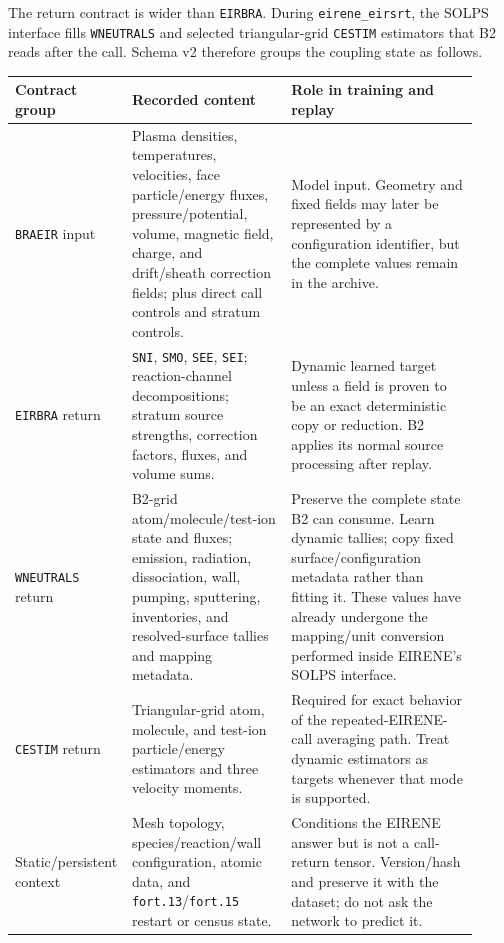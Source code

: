 \documentclass[11pt]{article}
\begin{document}
The return contract is wider than \texttt{EIRBRA}. During
\texttt{eirene\_eirsrt}, the SOLPS interface fills \texttt{WNEUTRALS} and
selected triangular-grid \texttt{CESTIM} estimators that B2 reads after the
call. Schema v2 therefore groups the coupling state as follows.

\begin{longtable}{@{}p{0.18\linewidth}p{0.34\linewidth}p{0.40\linewidth}@{}}
\toprule
Contract group & Recorded content & Role in training and replay \\
\midrule
\endhead
\texttt{BRAEIR} input & Plasma densities, temperatures, velocities, face particle/energy fluxes, pressure/potential, volume, magnetic field, charge, and drift/sheath correction fields; plus direct call controls and stratum controls. & Model input. Geometry and fixed fields may later be represented by a configuration identifier, but the complete values remain in the archive. \\
\texttt{EIRBRA} return & \texttt{SNI}, \texttt{SMO}, \texttt{SEE}, \texttt{SEI}; reaction-channel decompositions; stratum source strengths, correction factors, fluxes, and volume sums. & Dynamic learned target unless a field is proven to be an exact deterministic copy or reduction. B2 applies its normal source processing after replay. \\
\texttt{WNEUTRALS} return & B2-grid atom/molecule/test-ion state and fluxes; emission, radiation, dissociation, wall, pumping, sputtering, inventories, and resolved-surface tallies and mapping metadata. & Preserve the complete state B2 can consume. Learn dynamic tallies; copy fixed surface/configuration metadata rather than fitting it. These values have already undergone the mapping/unit conversion performed inside EIRENE's SOLPS interface. \\
\texttt{CESTIM} return & Triangular-grid atom, molecule, and test-ion particle/energy estimators and three velocity moments. & Required for exact behavior of the repeated-EIRENE-call averaging path. Treat dynamic estimators as targets whenever that mode is supported. \\
Static/persistent context & Mesh topology, species/reaction/wall configuration, atomic data, and \texttt{fort.13}/\texttt{fort.15} restart or census state. & Conditions the EIRENE answer but is not a call-return tensor. Version/hash and preserve it with the dataset; do not ask the network to predict it. \\
\bottomrule
\end{longtable}
\end{document}
